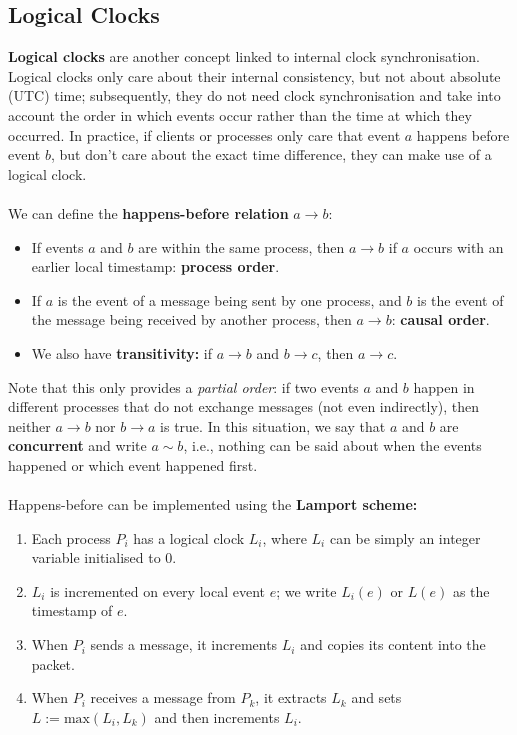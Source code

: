\documentclass[a4paper,11pt]{article}
\begin{document}
\subsection{Logical Clocks}
\textbf{Logical clocks} are another concept linked to internal clock synchronisation.
Logical clocks only care about their internal consistency, but not about absolute (UTC) time;
subsequently, they do not need clock synchronisation and take into account the order in which events occur rather than the time at which they occurred.
In practice, if clients or processes only care that event $a$ happens before event $b$, but don't care about the exact time difference, they can make use of a logical clock.
\\\\
We can define the \textbf{happens-before relation} $a \rightarrow b$:
\begin{itemize}
    \item   If events $a$ and $b$ are within the same process, then $a \rightarrow b$ if $a$ occurs with an earlier local timestamp: \textbf{process order}.
    \item   If $a$ is the event of a message being sent by one process, and $b$ is the event of the message being received by another process, then $a \rightarrow b$: \textbf{causal order}.
    \item   We also have \textbf{transitivity:} if $a \rightarrow b$ and $b \rightarrow c$, then $a \rightarrow c$.
\end{itemize}
Note that this only provides a \textit{partial order}:
if two events $a$ and $b$ happen in different processes that do not exchange messages (not even indirectly), then neither $a \rightarrow b$ nor $b \rightarrow a$ is true.
In this situation, we say that $a$ and $b$ are \textbf{concurrent} and write $a \sim b$, i.e., nothing can be said about when the events happened or which event happened first.
\\\\
Happens-before can be implemented using the \textbf{Lamport scheme:}
\begin{enumerate}
    \item   Each process $P_i$ has a logical clock $L_i$, where $L_i$ can be simply an integer variable initialised to 0.
    \item   $L_i$ is incremented on every local event $e$; we write $L_i(e)$ or $L(e)$ as the timestamp of $e$.
    \item   When $P_i$ sends a message, it increments $L_i$ and copies its content into the packet.
    \item   When $P_i$ receives a message from $P_k$, it extracts $L_k$ and sets $L := \text{max}(L_i, L_k)$ and then increments $L_i$.
\end{enumerate}
\end{document}
